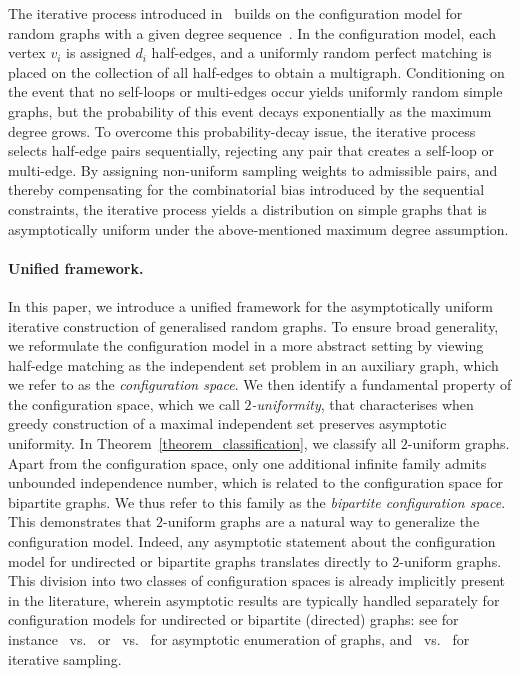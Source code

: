 \documentclass{article}
\theoremstyle{plain}
\theoremstyle{remark}
\theoremstyle{plain}
\numberwithin{equation}{section}
\begin{document}
	
	The iterative process introduced in~\cite{Bayati}  builds on the configuration model for random graphs with a given degree sequence~\cite{molloy1995}. In the configuration model, each vertex $v_i$ is assigned $d_i$ half-edges, and a uniformly random perfect matching is placed on the collection of all half-edges to obtain a multigraph. Conditioning on the event that no self-loops or multi-edges occur yields uniformly random simple graphs, but the probability of this event decays exponentially as the maximum degree grows. To overcome this probability-decay issue, the iterative process selects half-edge pairs sequentially, rejecting any pair that creates a self-loop or multi-edge. 
	By assigning non-uniform sampling weights to admissible pairs, and thereby compensating for the combinatorial bias introduced by the sequential constraints, the iterative process yields a distribution on simple graphs that is asymptotically uniform under the above-mentioned maximum degree assumption.
	
	
	
	
	\paragraph*{Unified framework.}
	In this paper, we introduce a unified framework for the asymptotically uniform
	iterative construction of generalised random graphs. To ensure broad generality, we reformulate the configuration model in a more abstract setting by viewing half-edge matching as the independent set problem in an auxiliary graph, which we refer to as the \emph{configuration space}.
	We then identify a fundamental property of the configuration space, which we call \emph{$2$-uniformity}, that characterises when greedy construction of a maximal independent set preserves asymptotic uniformity. In Theorem~\ref{theorem_classification}, we classify all $2$-uniform graphs. Apart from the configuration space, only one additional infinite family admits unbounded independence number, which is related to the configuration space for bipartite graphs. We thus refer to this family as the \emph{bipartite configuration space}. This demonstrates that $2$-uniform graphs are a natural way to generalize the configuration model. Indeed, any asymptotic statement about the configuration model for undirected or bipartite graphs translates directly to 2-uniform graphs. This division into two classes of configuration spaces is already implicitly present in the literature, wherein asymptotic results are typically handled separately for configuration models for undirected or bipartite (directed) graphs: see for instance~\cite{mckay1985asymptotics} vs.~\cite{mckay1984asymptotics} or~\cite{BENDER1978296} vs.~\cite{GREENHILL2008} for asymptotic enumeration of graphs, and~\cite{Bayati} vs.~\cite{Ieperen2024} for iterative sampling.
	
\end{document}
